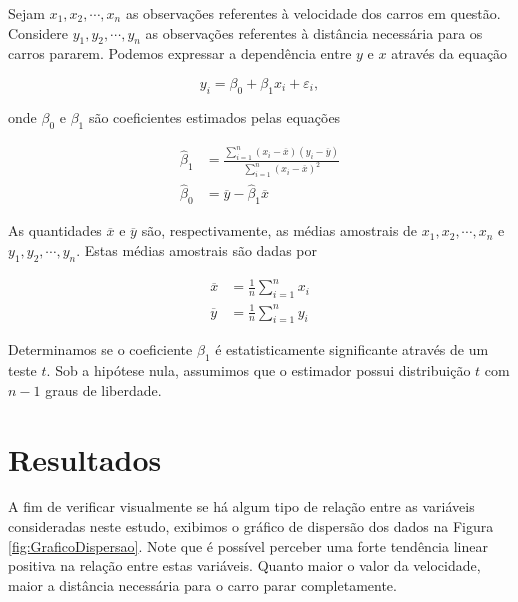 \documentclass[a4paper,12pt,twoside,printwatermark=true]{modeloLEA}
\numberwithin{equation}{section}
\numberwithin{figure}{section}
\numberwithin{table}{section}
\begin{document}
Sejam \(x_1, x_2, \cdots, x_n\) as observações referentes à velocidade
dos carros em questão. Considere \(y_1, y_2, \cdots, y_n\) as
observações referentes à distância necessária para os carros pararem.
Podemos expressar a dependência entre \(y\) e \(x\) através da equação

\begin{equation}
y_i = \beta_0 + \beta_1x_i + \varepsilon_i,
\end{equation}

\noindent onde \(\beta_0\) e \(\beta_1\) são coeficientes estimados
pelas equações

\begin{align}
\widehat{\beta}_1 &= \frac{\sum_{i=1}^n(x_i-\overline{x})(y_i-\overline{y})}{\sum_{i=1}^n(x_i-\overline{x})^2}  \label{estimadores01} \\
\widehat{\beta}_0 &= \overline{y}-\widehat{\beta}_1\overline{x}  \label{estimadores02}
\end{align}

\noindent As quantidades \(\overline{x}\) e \(\overline{y}\) são,
respectivamente, as médias amostrais de \(x_1, x_2, \cdots, x_n\) e
\(y_1, y_2, \cdots, y_n\). Estas médias amostrais são dadas por

\begin{align}
\overline{x} &= \frac{1}{n}\sum_{i=1}^nx_i \\
\overline{y} &= \frac{1}{n}\sum_{i=1}^ny_i 
\end{align}

Determinamos se o coeficiente \(\beta_1\) é estatisticamente
significante através de um teste \(t\). Sob a hipótese nula, assumimos
que o estimador possui distribuição \(t\) com \(n-1\) graus de
liberdade.

\hypertarget{resultados}{%
\section{Resultados}\label{resultados}}

A fim de verificar visualmente se há algum tipo de relação entre as
variáveis consideradas neste estudo, exibimos o gráfico de dispersão dos
dados na Figura \ref{fig:GraficoDispersao}. Note que é possível perceber
uma forte tendência linear positiva na relação entre estas variáveis.
Quanto maior o valor da velocidade, maior a distância necessária para o
carro parar completamente.

\begin{Shaded}
\begin{Highlighting}[]
\NormalTok{(}\OperatorTok{+}
\StringTok{  }\NormalTok{() }\OperatorTok{+}
\StringTok{  }\NormalTok{(}\NormalTok{, }\NormalTok{)}
\end{Highlighting}
\end{Shaded}
\end{document}
